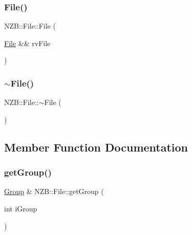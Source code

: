 \hypertarget{class_n_z_b_1_1_file_a3863e5112bd3e0ee5be4770bc7b4cb5e}{}\label{class_n_z_b_1_1_file_a3863e5112bd3e0ee5be4770bc7b4cb5e} 
\subsubsection{\texorpdfstring{File()}{File()}\hspace{0.1cm}{\footnotesize\ttfamily [4/4]}}
{\footnotesize\ttfamily N\+Z\+B\+::\+File\+::\+File (\begin{DoxyParamCaption}\item[{\hyperlink{class_n_z_b_1_1_file}{File} \&\&}]{rv\+File }\end{DoxyParamCaption})}

\hypertarget{class_n_z_b_1_1_file_ab9c267164945ff326166490b427b7393}{}\label{class_n_z_b_1_1_file_ab9c267164945ff326166490b427b7393} 
\subsubsection{\texorpdfstring{$\sim$\+File()}{~File()}}
{\footnotesize\ttfamily N\+Z\+B\+::\+File\+::$\sim$\+File (\begin{DoxyParamCaption}{ }\end{DoxyParamCaption})}



\subsection{Member Function Documentation}
\hypertarget{class_n_z_b_1_1_file_a7baaa4ddddfbe5a63671329cf239d8f5}{}\label{class_n_z_b_1_1_file_a7baaa4ddddfbe5a63671329cf239d8f5} 
\subsubsection{\texorpdfstring{get\+Group()}{getGroup()}\hspace{0.1cm}{\footnotesize\ttfamily [1/2]}}
{\footnotesize\ttfamily \hyperlink{class_n_z_b_1_1_group}{Group} \& N\+Z\+B\+::\+File\+::get\+Group (\begin{DoxyParamCaption}\item[{int}]{i\+Group }\end{DoxyParamCaption})}

